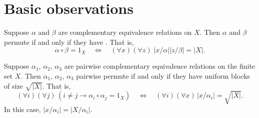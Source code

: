 

\section{Basic observations}
\begin{lemma}
\label{lem:1}
Suppose $\alpha$ and $\beta$ are complementary equivalence relations on
$X$. Then $\alpha$ and $\beta$ permute if and only if they have \cubs.
That is,
\begin{equation}
  \label{eq:9}
\alpha \circ \beta =1_X \quad \Longleftrightarrow \quad (\forall x)(\forall z)\;
|x/\alpha| |z/\beta| = |X|.
\end{equation}
\end{lemma}
\begin{corollary}
\label{cor:1}
Suppose $\alpha_1$, $\alpha_2$, $\alpha_3$ are pairwise complementary
equivalence relations on the finite set $X$. 
Then  $\alpha_1$, $\alpha_2$, $\alpha_3$ pairwise permute if and only if they
have uniform blocks of size $\sqrt{|X|}$.  That is,
\[
(\forall i)(\forall j) \, (i\neq j \longrightarrow \alpha_i \circ \alpha_j = 1_X)
\quad \Longleftrightarrow \quad (\forall i)(\forall x) \, |x/\alpha_i| =
\sqrt{|X|}.
\]
In this case,  $|x/\alpha_i| = |X/\alpha_i|$. %
\end{corollary}
